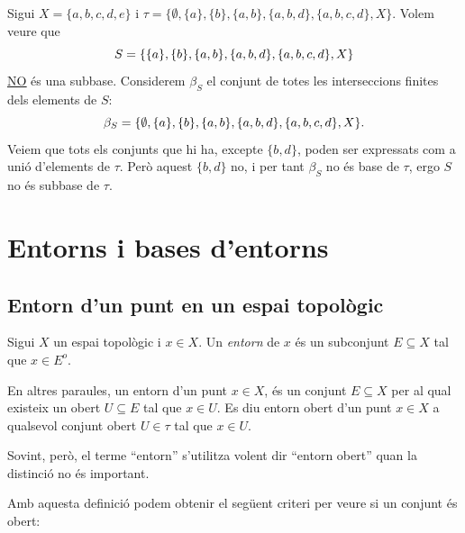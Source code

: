 \documentclass[../main.tex]{subfiles}
\begin{document}
\begin{ej}
\label{ej:subbase3} Sigui $X = \{a,b,c,d,e\}$ i $\tau = \{\emptyset,\{a\},\{b\},\{a,b\},\{a,b,d\},\{a,b,c,d\},X\}$. Volem veure que 
\begin{equation}
    \notag
    S = \{\{a\},\{b\},\{a,b\},\{a,b,d\},\{a,b,c,d\},X\}
\end{equation}
\underline{\underline{NO}} és una subbase. Considerem $\beta_S$ el conjunt de totes les interseccions finites dels elements de $S$:
\begin{equation}
    \notag
    \beta_S = \{\emptyset,\{a\},\{b\},\{a,b\},\{a,b,d\},\{a,b,c,d\},X\} .
\end{equation}
Veiem que tots els conjunts que hi ha, excepte $\{b,d\}$, poden ser expressats com a unió d'elements de $\tau$. Però aquest $\{b,d\}$ no, i per tant $\beta_S$ no és base de $\tau$, ergo $S$ no és subbase de $\tau$.
\end{ej}

\section{Entorns i bases d'entorns}
\subsection{Entorn d'un punt en un espai topològic}

\begin{defi}
[Entorn]\label{def:entorn} Sigui $X$ un espai topològic i $x\in X$. Un \textit{entorn} de $x$ és un subconjunt $E\subseteq X$ tal que $x\in E^{o}$.
\end{defi}

En altres paraules, un entorn d'un punt $x\in X$, és un conjunt $E\subseteq X$ per al qual existeix un obert $U\subseteq E$ tal que $x\in U$. Es diu entorn obert d'un punt $x\in X$ a qualsevol conjunt obert $U\in\tau$ tal que $x\in U$.

Sovint, però, el terme ``entorn'' s'utilitza volent dir ``entorn obert'' quan la distinció no és important.

Amb aquesta definició podem obtenir el següent criteri per veure si un conjunt és obert:
\end{document}
